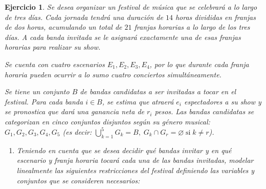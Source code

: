 \documentclass[a4paper,oneside,12pt]{amsart}
\newtheorem{quest}{Ejercicio}
\begin{document}
\begin{quest}

    Se desea organizar un festival de música que se celebrará a lo largo de tres días. Cada jornada tendrá una duración de $14$ horas divididas en franjas de dos horas, acumulando un total de $21$ franjas horarias a lo largo de los tres días. A cada banda invitada se le asignará exactamente una de esas franjas horarias para realizar su show.
    
    Se cuenta con cuatro escenarios $E_1,E_2,E_3,E_4$, por lo que durante cada franja horaria pueden ocurrir a lo sumo cuatro conciertos simultáneamente. 

    Se tiene un conjunto $B$ de bandas candidatas a ser invitadas a tocar en el festival. Para cada banda $i\in B$, se estima que atraerá $e_i$ espectadores a su show y se pronostica que dará una ganancia neta de $r_i$ pesos. Las bandas candidatas se categorizan en cinco conjuntos disjuntos según su género musical: $G_1, G_2, G_3, G_4, G_5$ (es decir: $\displaystyle\bigcup_{k=1}^5 G_k = B,\; G_k\cap G_r =\varnothing\;\text{si}\; k\neq r$).
    
    \begin{enumerate}
        \item Teniendo en cuenta que se desea decidir qué bandas invitar y en qué escenario y franja horaria tocará cada una de las bandas invitadas, modelar linealmente las siguientes restricciones del festival definiendo las variables y conjuntos que se consideren necesarios:
        

\end{enumerate}
\end{quest}
\end{document}
